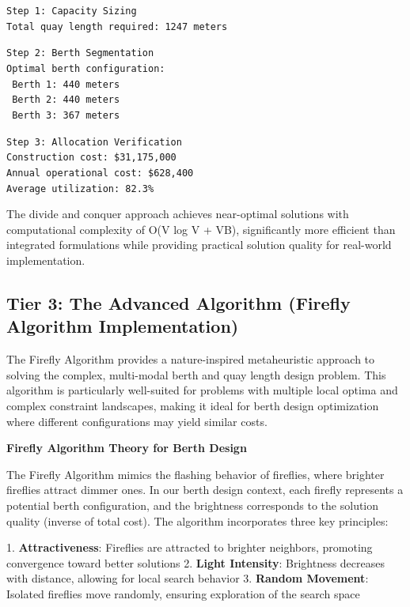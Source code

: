 \documentclass{article}
\begin{document}
\texttt{Step 1: Capacity Sizing}\\
\texttt{Total quay length required: 1247 meters}

\texttt{Step 2: Berth Segmentation}\\
\texttt{Optimal berth configuration:}\\
\texttt{  Berth 1: 440 meters}\\
\texttt{  Berth 2: 440 meters}\\
\texttt{  Berth 3: 367 meters}

\texttt{Step 3: Allocation Verification}\\
\texttt{Construction cost: \$31,175,000}\\
\texttt{Annual operational cost: \$628,400}\\
\texttt{Average utilization: 82.3\%}

The divide and conquer approach achieves near-optimal solutions with computational complexity of O(V log V + VB), significantly more efficient than integrated formulations while providing practical solution quality for real-world implementation.

\subsection{Tier 3: The Advanced Algorithm (Firefly Algorithm Implementation)}

The Firefly Algorithm provides a nature-inspired metaheuristic approach to solving the complex, multi-modal berth and quay length design problem. This algorithm is particularly well-suited for problems with multiple local optima and complex constraint landscapes, making it ideal for berth design optimization where different configurations may yield similar costs.

\textbf{Firefly Algorithm Theory for Berth Design}

The Firefly Algorithm mimics the flashing behavior of fireflies, where brighter fireflies attract dimmer ones. In our berth design context, each firefly represents a potential berth configuration, and the brightness corresponds to the solution quality (inverse of total cost). The algorithm incorporates three key principles:

1. \textbf{Attractiveness}: Fireflies are attracted to brighter neighbors, promoting convergence toward better solutions
2. \textbf{Light Intensity}: Brightness decreases with distance, allowing for local search behavior
3. \textbf{Random Movement}: Isolated fireflies move randomly, ensuring exploration of the search space
\end{document}
